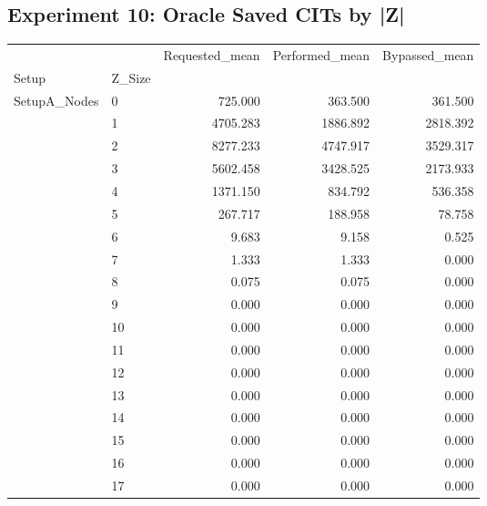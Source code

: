 \subsection*{Experiment 10: Oracle Saved CITs by |Z|}
\begin{tabular}{llrrr}
\toprule
               &    &  Requested\_mean &  Performed\_mean &  Bypassed\_mean \\
Setup & Z\_Size &                 &                 &                \\
\midrule
SetupA\_Nodes & 0  &         725.000 &         363.500 &        361.500 \\
               & 1  &        4705.283 &        1886.892 &       2818.392 \\
               & 2  &        8277.233 &        4747.917 &       3529.317 \\
               & 3  &        5602.458 &        3428.525 &       2173.933 \\
               & 4  &        1371.150 &         834.792 &        536.358 \\
               & 5  &         267.717 &         188.958 &         78.758 \\
               & 6  &           9.683 &           9.158 &          0.525 \\
               & 7  &           1.333 &           1.333 &          0.000 \\
               & 8  &           0.075 &           0.075 &          0.000 \\
               & 9  &           0.000 &           0.000 &          0.000 \\
               & 10 &           0.000 &           0.000 &          0.000 \\
               & 11 &           0.000 &           0.000 &          0.000 \\
               & 12 &           0.000 &           0.000 &          0.000 \\
               & 13 &           0.000 &           0.000 &          0.000 \\
               & 14 &           0.000 &           0.000 &          0.000 \\
               & 15 &           0.000 &           0.000 &          0.000 \\
               & 16 &           0.000 &           0.000 &          0.000 \\
               & 17 &           0.000 &           0.000 &          0.000 \\

\end{tabular}
